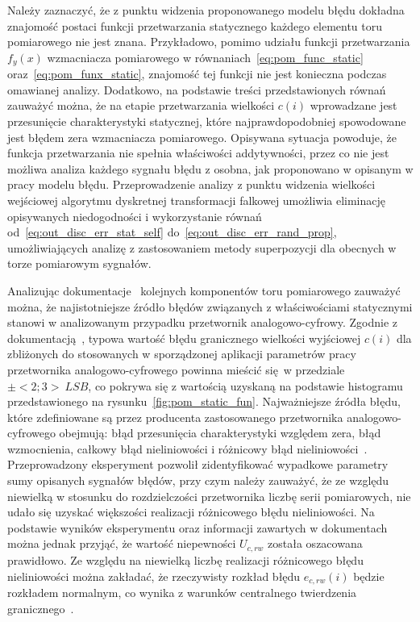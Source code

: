 Należy zaznaczyć, że z punktu widzenia proponowanego modelu błędu dokładna znajomość postaci funkcji przetwarzania statycznego każdego elementu toru pomiarowego nie jest znana. Przykładowo, pomimo udziału funkcji przetwarzania $f_{y}(x)$ wzmacniacza pomiarowego w równaniach~\eqref{eq:pom_func_static} oraz~\eqref{eq:pom_funx_static}, znajomość tej funkcji nie jest konieczna podczas omawianej analizy. Dodatkowo, na podstawie treści przedstawionych równań zauważyć można, że na etapie przetwarzania wielkości $c(i)$ wprowadzane jest przesunięcie charakterystyki statycznej, które najprawdopodobniej spowodowane jest błędem zera wzmacniacza pomiarowego. Opisywana sytuacja powoduje, że funkcja przetwarzania nie spełnia właściwości addytywności, przez co nie jest możliwa analiza każdego sygnału błędu z osobna, jak proponowano w opisanym w pracy modelu błędu. Przeprowadzenie analizy z punktu widzenia wielkości wejściowej algorytmu dyskretnej transformacji falkowej umożliwia eliminację opisywanych niedogodności i wykorzystanie równań od~\eqref{eq:out_disc_err_stat_self} do~\eqref{eq:out_disc_err_rand_prop}, umożliwiających analizę z zastosowaniem metody superpozycji dla obecnych w torze pomiarowym sygnałów.

Analizując dokumentacje~\cite{microchip_manual, stm_manual, diodes_manual, stm_f411} kolejnych komponentów toru pomiarowego zauważyć można, że najistotniejsze źródło błędów związanych z właściwościami statycznymi stanowi w analizowanym przypadku przetwornik analogowo-cyfrowy. Zgodnie z dokumentacją~\cite{stm_f411}, typowa wartość błędu granicznego wielkości wyjściowej $c(i)$ dla zbliżonych do stosowanych w sporządzonej aplikacji parametrów pracy przetwornika analogowo-cyfrowego powinna mieścić się w przedziale $\pm<2; 3>~\unit{LSB}$, co pokrywa się z wartością uzyskaną na podstawie histogramu przedstawionego na rysunku~\ref{fig:pom_static_fun}. Najważniejsze źródła błędu, które zdefiniowane są przez producenta zastosowanego przetwornika analogowo-cyfrowego obejmują: błąd przesunięcia charakterystyki względem zera, błąd wzmocnienia, całkowy błąd nieliniowości i różnicowy błąd nieliniowości~\cite{stm_adc}. Przeprowadzony eksperyment pozwolił zidentyfikować wypadkowe parametry sumy opisanych sygnałów błędów, przy czym należy zauważyć, że ze względu niewielką w stosunku do rozdzielczości przetwornika liczbę serii pomiarowych, nie udało się uzyskać większości realizacji różnicowego błędu nieliniowości. Na podstawie wyników eksperymentu oraz informacji zawartych w dokumentach~\cite{stm_f411, stm_adc} można jednak przyjąć, że wartość niepewności $U_{c,rw}$ została oszacowana prawidłowo. Ze względu na niewielką liczbę realizacji różnicowego błędu nieliniowości można zakładać, że rzeczywisty rozkład błędu $e_{c,rw}(i)$ będzie rozkładem normalnym, co wynika z warunków centralnego twierdzenia granicznego~\cite{jcgm_guide}.


